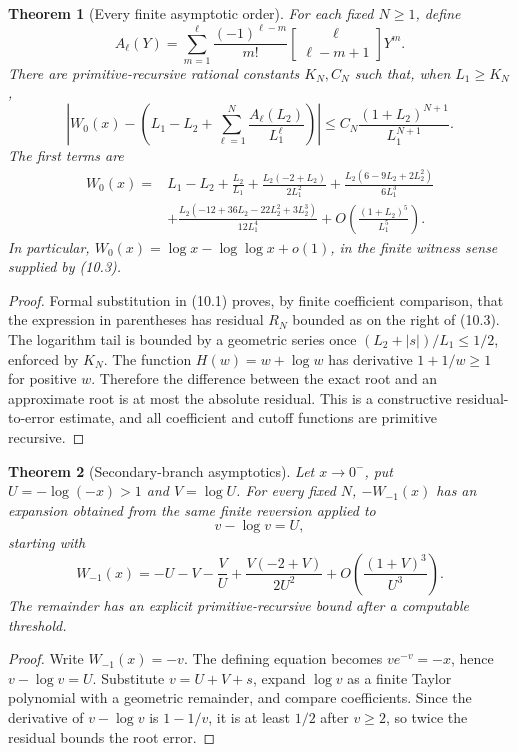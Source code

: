 \documentclass[11pt]{article}
\newtheorem{theorem}{Theorem}[section]
\theoremstyle{definition}
\newcommand{\abs}[1]{\left|#1\right|}
\begin{document}
\begin{theorem}[Every finite asymptotic order]\label{thm:asymptotic}
For each fixed \(N\ge1\), define
\[
 A_\ell(Y)=\sum_{m=1}^{\ell}
 \frac{(-1)^{\ell-m}}{m!}
 \genfrac{[}{]}{0pt}{}{\ell}{\ell-m+1}Y^m.
 \tag{10.2}
\]
There are primitive-recursive rational constants \(K_N,C_N\) such that, when
\(L_1\ge K_N\),
\[
 \left|W_0(x)-\left(L_1-L_2+
 \sum_{\ell=1}^{N}\frac{A_\ell(L_2)}{L_1^\ell}\right)\right|
 \le C_N\frac{(1+L_2)^{N+1}}{L_1^{N+1}}.
 \tag{10.3}
\]
The first terms are
\begin{align*}
 W_0(x)={}&L_1-L_2+\frac{L_2}{L_1}
 +\frac{L_2(-2+L_2)}{2L_1^2}
 +\frac{L_2(6-9L_2+2L_2^2)}{6L_1^3}\\
 &+\frac{L_2(-12+36L_2-22L_2^2+3L_2^3)}{12L_1^4}
 +O\!\left(\frac{(1+L_2)^5}{L_1^5}\right).
 \tag{10.4}
\end{align*}
In particular,
\(W_0(x)=\log x-\log\log x+o(1)\), in the finite witness sense supplied by
(10.3).
\end{theorem}

\begin{proof}
Formal substitution in (10.1) proves, by finite coefficient comparison, that
the expression in parentheses has residual
\(R_N\) bounded as on the right of (10.3).  The logarithm tail is bounded by a
geometric series once \((L_2+\abs{s})/L_1\le1/2\), enforced by \(K_N\).
The function \(H(w)=w+\log w\) has derivative
\(1+1/w\ge1\) for positive \(w\).  Therefore the difference between the exact
root and an approximate root is at most the absolute residual.  This is a
constructive residual-to-error estimate, and all coefficient and cutoff
functions are primitive recursive.
\end{proof}

\begin{theorem}[Secondary-branch asymptotics]\label{thm:wm-asymptotic}
Let \(x\to0^-\), put \(U=-\log(-x)>1\) and \(V=\log U\).  For every fixed
\(N\), \(-W_{-1}(x)\) has an expansion obtained from the same finite reversion
applied to
\[
 v-\log v=U,
\]
starting with
\[
 W_{-1}(x)=-U-V-\frac{V}{U}
 +\frac{V(-2+V)}{2U^2}
 +O\!\left(\frac{(1+V)^3}{U^3}\right).
 \tag{10.5}
\]
The remainder has an explicit primitive-recursive bound after a computable
threshold.
\end{theorem}

\begin{proof}
Write \(W_{-1}(x)=-v\).  The defining equation becomes
\(v e^{-v}=-x\), hence \(v-\log v=U\).  Substitute
\(v=U+V+s\), expand \(\log v\) as a finite Taylor polynomial with a geometric
remainder, and compare coefficients.  Since the derivative of
\(v-\log v\) is \(1-1/v\), it is at least \(1/2\) after \(v\ge2\), so twice
the residual bounds the root error.
\end{proof}
\end{document}
